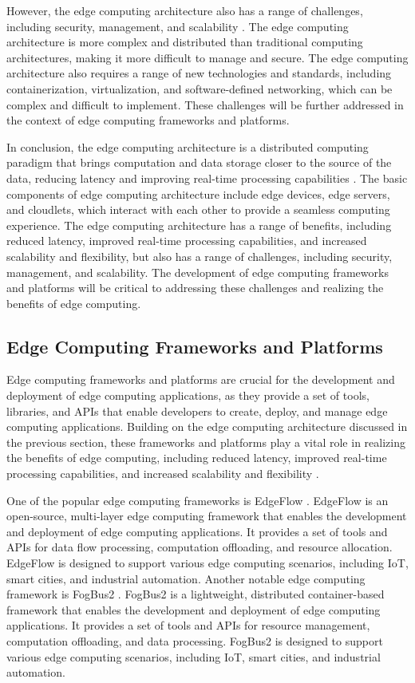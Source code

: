 \documentclass[11pt]{article}
\begin{document}
However, the edge computing architecture also has a range of challenges, including security, management, and scalability \cite{ref16}. The edge computing architecture is more complex and distributed than traditional computing architectures, making it more difficult to manage and secure. The edge computing architecture also requires a range of new technologies and standards, including containerization, virtualization, and software-defined networking, which can be complex and difficult to implement. These challenges will be further addressed in the context of edge computing frameworks and platforms.

In conclusion, the edge computing architecture is a distributed computing paradigm that brings computation and data storage closer to the source of the data, reducing latency and improving real-time processing capabilities \cite{ref2}. The basic components of edge computing architecture include edge devices, edge servers, and cloudlets, which interact with each other to provide a seamless computing experience. The edge computing architecture has a range of benefits, including reduced latency, improved real-time processing capabilities, and increased scalability and flexibility, but also has a range of challenges, including security, management, and scalability. The development of edge computing frameworks and platforms will be critical to addressing these challenges and realizing the benefits of edge computing.

\subsection{Edge Computing Frameworks and Platforms}

Edge computing frameworks and platforms are crucial for the development and deployment of edge computing applications, as they provide a set of tools, libraries, and APIs that enable developers to create, deploy, and manage edge computing applications. Building on the edge computing architecture discussed in the previous section, these frameworks and platforms play a vital role in realizing the benefits of edge computing, including reduced latency, improved real-time processing capabilities, and increased scalability and flexibility \cite{ref1}.

One of the popular edge computing frameworks is EdgeFlow \cite{ref30}. EdgeFlow is an open-source, multi-layer edge computing framework that enables the development and deployment of edge computing applications. It provides a set of tools and APIs for data flow processing, computation offloading, and resource allocation. EdgeFlow is designed to support various edge computing scenarios, including IoT, smart cities, and industrial automation. Another notable edge computing framework is FogBus2 \cite{ref33}. FogBus2 is a lightweight, distributed container-based framework that enables the development and deployment of edge computing applications. It provides a set of tools and APIs for resource management, computation offloading, and data processing. FogBus2 is designed to support various edge computing scenarios, including IoT, smart cities, and industrial automation.
\end{document}
